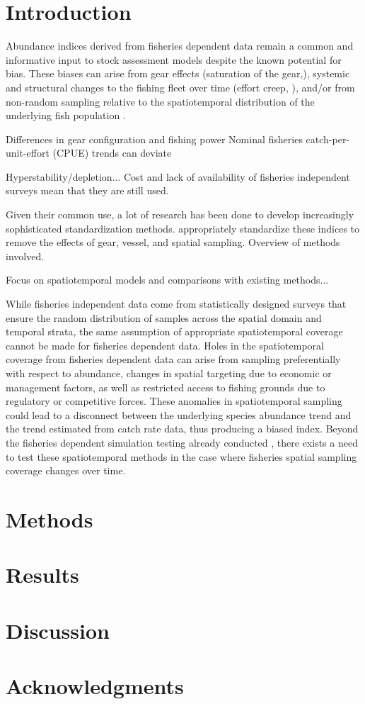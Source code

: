 \documentclass[authoryear,preprint,review,12pt]{elsarticle}
\begin{document}
\linenumbers

\section{Introduction}\label{Intro}
Abundance indices derived from fisheries dependent data remain a common and informative input to stock assessment models despite the known potential for bias. These biases can arise from gear effects (saturation of the gear,\citet{deriso_odds_1987}), systemic and structural changes to the fishing fleet over time (effort creep, \citet{bishop_analysing_2004,ye_how_2009}), and/or from non-random sampling relative to the spatiotemporal distribution of the underlying fish population \citep{clark_aggregation_1979, rose_effects_1991, rose_hyperaggregation_1999,swain_fish_1994}. 

Differences in gear configuration and fishing power Nominal fisheries catch-per-unit-effort (CPUE) trends can deviate   

Hyperstability/depletion...
Cost and lack of availability of fisheries independent surveys mean that they are still used.

Given their common use, a lot of research has been done to develop increasingly sophisticated standardization methods. appropriately standardize these indices to remove the effects of gear, vessel, and spatial sampling. Overview of methods involved.

Focus on spatiotemporal models and comparisons with existing methods...

While fisheries independent data come from statistically designed surveys that ensure the random distribution of samples across the spatial domain and temporal strata, the same assumption of appropriate spatiotemporal coverage cannot be made for fisheries dependent data. Holes in the spatiotemporal coverage from fisheries dependent data can arise from sampling preferentially with respect to abundance, changes in spatial targeting due to economic or management factors, as well as restricted access to fishing grounds due to regulatory or competitive forces. These anomalies in spatiotemporal sampling could lead to a disconnect between the underlying species abundance trend and the trend estimated from catch rate data, thus producing a biased index. Beyond the fisheries dependent simulation testing already conducted \citep{gruss_evaluation_2019,zhou_catch_2019}, there exists a need to test these spatiotemporal methods in the case where fisheries spatial sampling coverage changes over time.  

\section{Methods}\label{Methods}

\section{Results}\label{Results}

\section{Discussion}\label{Discussion}

\section{Acknowledgments}\label{Ack}


\end{document}

